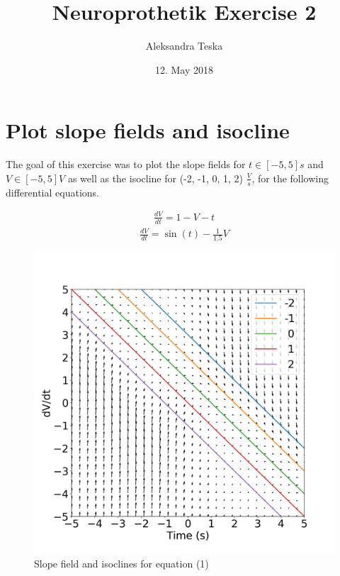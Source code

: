 \documentclass{scrartcl}			%
\title{Neuroprothetik Exercise 2}
\author{Aleksandra Teska}
\date{12. May 2018}
\begin{document}

\maketitle

\section{Plot slope fields and isocline}		%
The goal of this exercise was to plot the slope fields for $t \in [−5, 5 ]s$ and $V \in [−5, 5 ]V$ as well as the isocline for (-2, -1, 0, 1, 2) $\frac{V}{s}$, for the following differential equations.

\begin{align}
\frac{dV}{dt} =  1 - V -t
\end{align}			
\begin{align}
\frac{dV}{dt} = \sin(t) - \frac{1}{1.5}V
\end{align}			

\begin{figure}[H]					%
	\centering
	\includegraphics[scale=0.36]{1_0.png}
	\captionsetup{width=\linewidth}  %
	\caption{Slope field and isoclines for equation (1)}
	\label{subsec_fig1_0} %
\end{figure}
\end{document}
